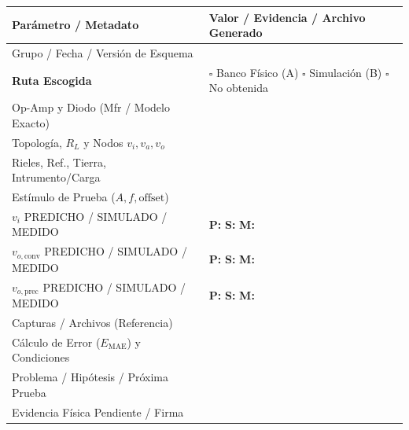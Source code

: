 \documentclass[10pt, a4paper]{article}
\begin{document}
\begin{table}[htbp]
    \centering
    \renewcommand{\arraystretch}{1.8}
    \begin{tabularx}{\textwidth}{|P{4.5cm}|X|}
    \hline
    \textbf{Parámetro / Metadato} & \textbf{Valor / Evidencia / Archivo Generado} \\ \hline
    Grupo / Fecha / Versión de Esquema & \\ \hline
    \textbf{Ruta Escogida} & $\square$ Banco Físico (A) \quad $\square$ Simulación (B) \quad $\square$ No obtenida \\ \hline
    Op-Amp y Diodo (Mfr / Modelo Exacto) & \\ \hline
    Topología, $R_L$ y Nodos $v_i, v_a, v_o$ & \\ \hline
    Rieles, Ref., Tierra, Intrumento/Carga & \\ \hline
    Estímulo de Prueba ($A, f, \text{offset}$) & \\ \hline
    $v_i$ PREDICHO / SIMULADO / MEDIDO & \textbf{P:} \hspace{2cm} \textbf{S:} \hspace{2cm} \textbf{M:} \\ \hline
    $v_{o,\mathrm{conv}}$ PREDICHO / SIMULADO / MEDIDO & \textbf{P:} \hspace{2cm} \textbf{S:} \hspace{2cm} \textbf{M:} \\ \hline
    $v_{o,\mathrm{prec}}$ PREDICHO / SIMULADO / MEDIDO & \textbf{P:} \hspace{2cm} \textbf{S:} \hspace{2cm} \textbf{M:} \\ \hline
    Capturas / Archivos (Referencia) & \\ \hline
    Cálculo de Error ($E_{\mathrm{MAE}}$) y Condiciones & \\ \hline
    Problema / Hipótesis / Próxima Prueba & \\ \hline
    Evidencia Física Pendiente / Firma & \\ \hline
    \end{tabularx}
\end{table}
\end{document}
